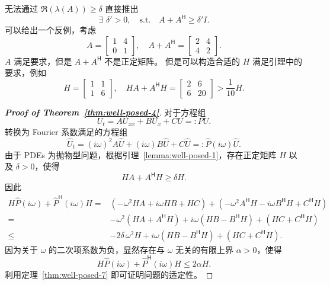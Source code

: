 \begin{remark}
    无法通过 $\Re(\lambda(A)) \ge \delta$ 直接推出
    \[
        \exists\,\,\delta' > 0,\quad \text{s.t.} \quad A + A^{\mathsf{H}} \ge \delta' I.
    \]
    可以给出一个反例，考虑
    \[
        A = \begin{bmatrix}
            1 & 4 \\
            0 & 1
        \end{bmatrix},\quad  A + A^{\mathsf{H}} = \begin{bmatrix}
            2 & 4 \\
            4 & 2
        \end{bmatrix}.
    \]
    $A$ 满足要求，但是 $A + A^{\mathsf{H}}$ 不是正定矩阵。
    但是可以构造合适的 $H$ 满足引理中的要求，例如
    \[
        H = \begin{bmatrix}
            1 & 1 \\
            1 & 6
        \end{bmatrix}, \quad
        H A + A^{\mathsf{H}} H = \begin{bmatrix}
            2 & 6  \\
            6 & 20
        \end{bmatrix} > \frac{1}{10} H.
    \]
\end{remark}

\begin{proof}[\normalfont\bfseries Proof of Theorem~\ref{thm:well-posed-4}]
    对于方程组
    \[
        U_t = A U_{xx} + B U_x + C U =: P U.
    \]
    转换为 Fourier 系数满足的方程组
    \[
        \widehat{U}_t = (i \omega)^2 A \widehat{U}  + (i \omega) B \widehat{U} + C \widehat{U}
        =: \widehat{P}(i \omega) \widehat{U}.
    \]
    由于 PDEs 为抛物型问题，根据引理~\ref{lemma:well-posed-1}，存在正定矩阵 $H$ 以及 $\delta > 0$，使得
    \[
        H A + A^\mathsf{H} H \ge \delta H.
    \]
    因此
    \begin{align*}
        H \widehat{P}(i \omega) + \widehat{P}^\mathsf{H}(i \omega) H
        ={}   & \left(-\omega^2 H A + i \omega H B + H C\right)
        + \left(-\omega^2 A^\mathsf{H} H - i \omega B^\mathsf{H} H + C^\mathsf{H} H\right)                \\
        ={}   & -\omega^2 (H A + A^\mathsf{H} H) + i \omega (H B - B^\mathsf{H}H) + (HC + C^\mathsf{H} H) \\
        \le{} & - 2 \delta\, \omega^2 H + i \omega (H B - B^\mathsf{H}H) + (HC + C^\mathsf{H} H).
    \end{align*}
    因为关于 $\omega$ 的二次项系数为负，显然存在与 $\omega$ 无关的有限上界 $\alpha > 0$，使得
    \[
        H \widehat{P}(i \omega) + \widehat{P}^\mathsf{H}(i \omega) H \le 2 \alpha H.
    \]
    利用定理~\ref{thm:well-posed-7} 即可证明问题的适定性。
\end{proof}


